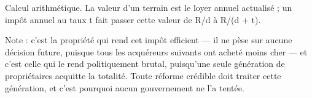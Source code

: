 Calcul arithmétique. La valeur d'un terrain est le loyer annuel actualisé ; un impôt annuel au taux t fait passer cette valeur de R/d à R/(d + t).\par Note : c'est la propriété qui rend cet impôt efficient — il ne pèse sur aucune décision future, puisque tous les acquéreurs suivants ont acheté moins cher — et c'est celle qui le rend politiquement brutal, puisqu'une seule génération de propriétaires acquitte la totalité. Toute réforme crédible doit traiter cette génération, et c'est pourquoi aucun gouvernement ne l'a tentée.
